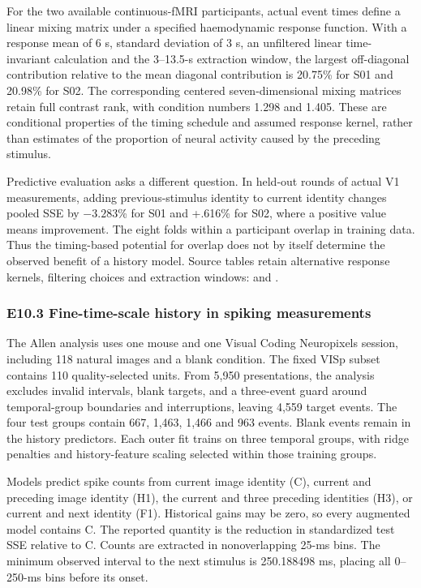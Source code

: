 \documentclass[11pt,a4paper]{article}
\begin{document}
For the two available continuous-fMRI participants, actual event times
define a linear mixing matrix under a specified haemodynamic response
function. With a response mean of 6 s, standard deviation of 3 s, an
unfiltered linear time-invariant calculation and the 3–13.5-s
extraction window, the largest off-diagonal contribution relative to the
mean diagonal contribution is 20.75\% for S01 and 20.98\% for S02. The
corresponding centered seven-dimensional mixing matrices retain full
contrast rank, with condition numbers 1.298 and 1.405. These are
conditional properties of the timing schedule and assumed response
kernel, rather than estimates of the proportion of neural activity
caused by the preceding stimulus.

Predictive evaluation asks a different question. In held-out rounds of
actual V1 measurements, adding previous-stimulus identity to current
identity changes pooled SSE by \(-3.283\)\% for S01 and +.616\% for S02,
where a positive value means improvement. The eight folds within a
participant overlap in training data. Thus the timing-based potential
for overlap does not by itself determine the observed benefit of a
history model. Source tables retain alternative response kernels,
filtering choices and extraction windows:
 and
.

\subsubsection{E10.3 Fine-time-scale history in spiking
measurements}\label{e10.3-fine-time-scale-history-in-spiking-measurements}

The Allen analysis uses one mouse and one Visual Coding Neuropixels
session, including 118 natural images and a blank condition. The fixed
VISp subset contains 110 quality-selected units. From 5,950
presentations, the analysis excludes invalid intervals, blank targets,
and a three-event guard around temporal-group boundaries and
interruptions, leaving 4,559 target events. The four test groups contain
667, 1,463, 1,466 and 963 events. Blank events remain in the history
predictors. Each outer fit trains on three temporal groups, with ridge
penalties and history-feature scaling selected within those training
groups.

Models predict spike counts from current image identity (C), current and
preceding image identity (H1), the current and three preceding
identities (H3), or current and next identity (F1). Historical gains may
be zero, so every augmented model contains C. The reported quantity is
the reduction in standardized test SSE relative to C. Counts are
extracted in nonoverlapping 25-ms bins. The minimum observed interval to
the next stimulus is 250.188498 ms, placing all 0–250-ms bins before
its onset.
\end{document}
